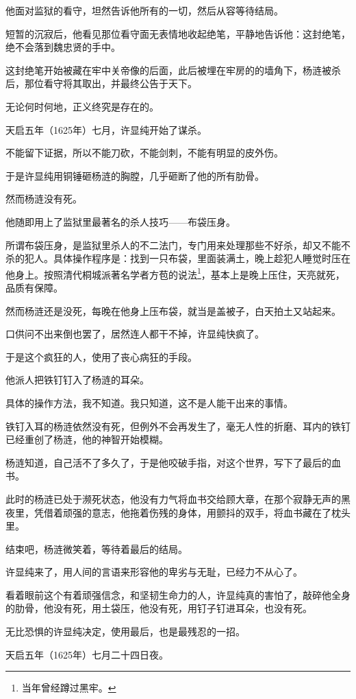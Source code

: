 \begin{multicols}{\theparacolNo}
他面对监狱的看守，坦然告诉他所有的一切，然后从容等待结局。

短暂的沉寂后，他看见那位看守面无表情地收起绝笔，平静地告诉他：这封绝笔，绝不会落到魏忠贤的手中。

这封绝笔开始被藏在牢中关帝像的后面，此后被埋在牢房的的墙角下，杨涟被杀后，那位看守将其取出，并最终公告于天下。

无论何时何地，正义终究是存在的。

天启五年（1625年）七月，许显纯开始了谋杀。

不能留下证据，所以不能刀砍，不能剑刺，不能有明显的皮外伤。

于是许显纯用铜锤砸杨涟的胸膛，几乎砸断了他的所有肋骨。

然而杨涟没有死。

他随即用上了监狱里最著名的杀人技巧——布袋压身。

所谓布袋压身，是监狱里杀人的不二法门，专门用来处理那些不好杀，却又不能不杀的犯人。具体操作程序是：找到一只布袋，里面装满土，晚上趁犯人睡觉时压在他身上。按照清代桐城派著名学者方苞的说法\footnote{当年曾经蹲过黑牢。}，基本上是晚上压住，天亮就死，品质有保障。

然而杨涟还是没死，每晚在他身上压布袋，就当是盖被子，白天拍土又站起来。

口供问不出来倒也罢了，居然连人都干不掉，许显纯快疯了。

于是这个疯狂的人，使用了丧心病狂的手段。

他派人把铁钉钉入了杨涟的耳朵。

具体的操作方法，我不知道。我只知道，这不是人能干出来的事情。

铁钉入耳的杨涟依然没有死，但例外不会再发生了，毫无人性的折磨、耳内的铁钉已经重创了杨涟，他的神智开始模糊。

杨涟知道，自己活不了多久了，于是他咬破手指，对这个世界，写下了最后的血书。

此时的杨涟已处于濒死状态，他没有力气将血书交给顾大章，在那个寂静无声的黑夜里，凭借着顽强的意志，他拖着伤残的身体，用颤抖的双手，将血书藏在了枕头里。

结束吧，杨涟微笑着，等待着最后的结局。

许显纯来了，用人间的言语来形容他的卑劣与无耻，已经力不从心了。

看着眼前这个有着顽强信念，和坚韧生命力的人，许显纯真的害怕了，敲碎他全身的肋骨，他没有死，用土袋压，他没有死，用钉子钉进耳朵，也没有死。

无比恐惧的许显纯决定，使用最后，也是最残忍的一招。

天启五年（1625年）七月二十四日夜。


\end{multicols}
